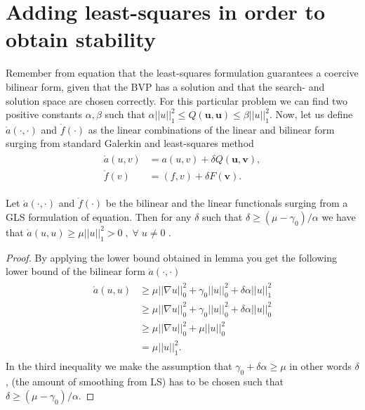 \section{Adding least-squares in order to obtain stability}

Remember from equation that the least-squares formulation guarantees a coercive bilinear form, given that the BVP has a solution and that the search- and solution space are chosen correctly. For this particular problem we can find two positive constants $\alpha,\beta$ such that $\alpha||u||_1^2 \leq Q(\mathbf{u},\mathbf{u}) \leq \beta||u||_1^2 $.
Now, let us define $\mathring{a}(\cdot,\cdot)$ and $\mathring{f}(\cdot)$ as the linear combinations of the linear and bilinear form surging from standard Galerkin and least-squares method
\begin{align}
	\begin{split}
	\mathring{a}(u,v) &= a(u,v) + \delta Q(\mathbf{u},\mathbf{\mathbf{v}}), \\
	 \mathring{f}(v) &= (f,v) + \delta F(\mathbf{\mathbf{v}}).
	\end{split}
	\label{eq:GLS}
\end{align}
\begin{lemma}
	Let $\mathring{a}(\cdot,\cdot)$ and $\mathring{f}(\cdot)$ be the bilinear and the linear functionals surging from a GLS formulation of equation. Then for any $\delta$ such that $\delta \geq (\mu-\gamma_0)/\alpha$ we have that $\mathring{a}(u,u) \geq \mu ||u||_1^2>0 \; , \; \forall \; u \neq 0$ .
	\label{lemmaCoercive}
\end{lemma}

\begin{proof}
	
	
By applying the lower bound obtained in lemma  you get the following lower bound of the bilinear form $\mathring{a}(\cdot,\cdot)$
\begin{align}
	\begin{split}
	\mathring{a}(u,u) &\geq \mu ||\nabla u||_0^2+\gamma_0||u||_0^2+\delta \alpha ||u||^2_1 \\
	&\geq \mu ||\nabla u||_0^2+\gamma_0||u||_0^2+\delta \alpha ||u||^2_0 \\
	&\geq \mu ||\nabla u||_0^2+\mu ||u||_0^2 \\
	&= \mu ||u||^2_1.
	\end{split}
	\label{eq:coercivity}
\end{align}
In the third inequality we make the assumption that $\gamma_0+\delta \alpha \geq \mu $ in other words $\delta$, (the amount of smoothing from LS) has to be chosen such that $\delta \geq (\mu-\gamma_0)/\alpha$.
\end{proof}

